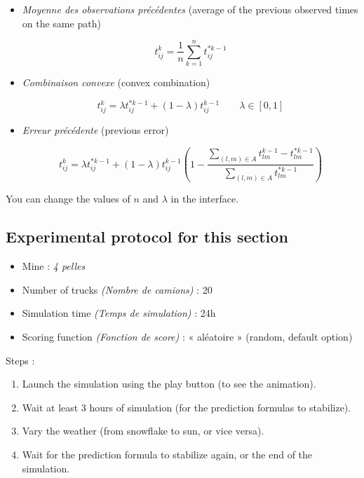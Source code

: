 \documentclass[letterpaper,12pt]{article}
\begin{document}
	
	
	\begin{itemize}
		
		\item \textit{Moyenne des observations précédentes }(average of the previous observed times on the same path)
		
		\begin{equation}
		t_{ij}^k = \frac{1}{n} \sum\limits_{k=1}^n t_{ij}^{*k-1}
		\end{equation}
		
		\item \textit{Combinaison convexe }(convex combination)
		
		\begin{equation}
		t_{ij}^k = \lambda t^{*k-1}_{ij} + (1-\lambda) t_{ij}^{k-1} \qquad \lambda \in [0, 1]
		\end{equation}
		
		\item \textit{Erreur précédente} (previous error)
		
		\begin{equation}
		t_{ij}^k = \lambda t^{*k-1}_{ij} + (1-\lambda) t_{ij}^{k-1} \left( 1- \frac{\sum\limits_{(l,m) \in A} t_{lm}^{k-1} - t_{lm}^{*k-1}}{\sum\limits_{(l,m) \in A} t_{lm}^{*k-1}}\right)
		\end{equation}
		
		
	\end{itemize}
	
	You can change the values of $n$ and $\lambda$ in the interface.

	
	\subsection*{Experimental protocol for this section}
	
	\begin{itemize}
		\item Mine : \textit{4 pelles}
		\item Number of trucks \textit{(Nombre de camions)} : 20
		\item Simulation time \textit{(Temps de simulation)} : 24h
		\item Scoring function \textit{(Fonction de score)} : « aléatoire » (random, default option)
	\end{itemize}
	
	Steps : 
	\begin{enumerate}
		\item Launch the simulation using the play button (to see the animation).
		\item Wait at least 3 hours of simulation (for the prediction formulas to stabilize).
		\item Vary the weather (from snowflake to sun, or vice versa).
		\item Wait for the prediction formula to stabilize again, or the end of the simulation.
	\end{enumerate}
	
\end{document}
